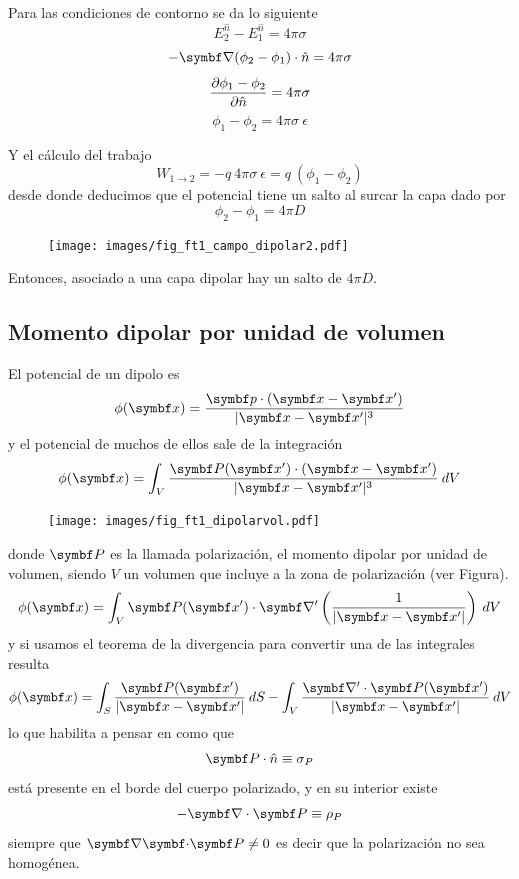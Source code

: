 \documentclass[10pt,oneside]{CBFT_book}
\begin{document}
Para las condiciones de contorno se da lo siguiente
\[
	E_2^{\hat{n}} - E_1^{\hat{n}} = 4\pi\sigma
\]
\[
	- \Nabla (\phi_2 - \phi_1)\cdot \hat{n} = 4\pi\sigma
\]
\[
	\frac{\partial^{\hspace{-0.05em}} {\phi_1 - \phi_2}}{\partial {\hat{n}}^{\hspace{-0.05em}}} = 4\pi\sigma
\]
\[
	\phi_1 - \phi_2 = 4\pi\sigma\:\epsilon
\]

Y el cálculo del trabajo
\[
	W_{1\to 2} = - q \: 4 \pi \sigma \:\epsilon = q\:( \phi_1 - \phi_2 )
\]
desde donde deducimos que el potencial tiene un salto al surcar la capa dado por 
\[
	\phi_2 - \phi_1 = 4\pi D
\]
\begin{figure}[htb]
	\begin{center}
	\texttt{[image: images/fig\_ft1\_campo\_dipolar2.pdf]}	 
	\end{center}
	\caption{}
\end{figure}

Entonces, asociado a una capa dipolar hay un salto de $4\pi D$.


\subsection{Momento dipolar por unidad de volumen}

El potencial de un dipolo es
\[
	\phi(\vb{x}) = \frac{ \vb{p}\cdot(\vb{x}-\vb{x}') }{|\vb{x} - \vb{x}'|^3} 
\]
y el potencial de muchos de ellos sale de la integración
\[
	\phi(\vb{x}) = \int_V \frac{ \vb{P}(\vb{x}')\cdot(\vb{x}-\vb{x}') }{|\vb{x} - \vb{x}'|^3}  \: dV
\]
\begin{figure}[htb]
	\begin{center}
	\texttt{[image: images/fig\_ft1\_dipolarvol.pdf]}	 
	\end{center}
	\caption{}
\end{figure}
donde $\vb{P}$ es la llamada polarización, el momento dipolar por unidad de volumen, siendo $V$ un volumen
que incluye a la zona de polarización (ver Figura).
\[
	\phi(\vb{x}) = \int_V \vb{P}(\vb{x}')\cdot \Nabla' \left(\frac{1}{|\vb{x} - \vb{x}'|} \right)\: dV
\]
y si usamos el teorema de la divergencia para convertir una de las integrales resulta
\[
	\phi(\vb{x}) = \int_S \frac{\vb{P}(\vb{x}')}{ |\vb{x} - \vb{x}'|} \: dS
	- \int_V  \frac{  \Nabla' \cdot \vb{P}(\vb{x}') }{|\vb{x} - \vb{x}'|} \: dV 
\]
lo que habilita a pensar en como que 
\[
	\vb{P}\cdot\hat{n} \equiv \sigma_P
\]
está presente en el borde del cuerpo polarizado, y en su interior existe
\[
	- \Nabla\cdot\vb{P} \equiv \rho_P
\]
siempre que $\divem{P}\neq 0$ es decir que la polarización no sea homogénea.
\end{document}
